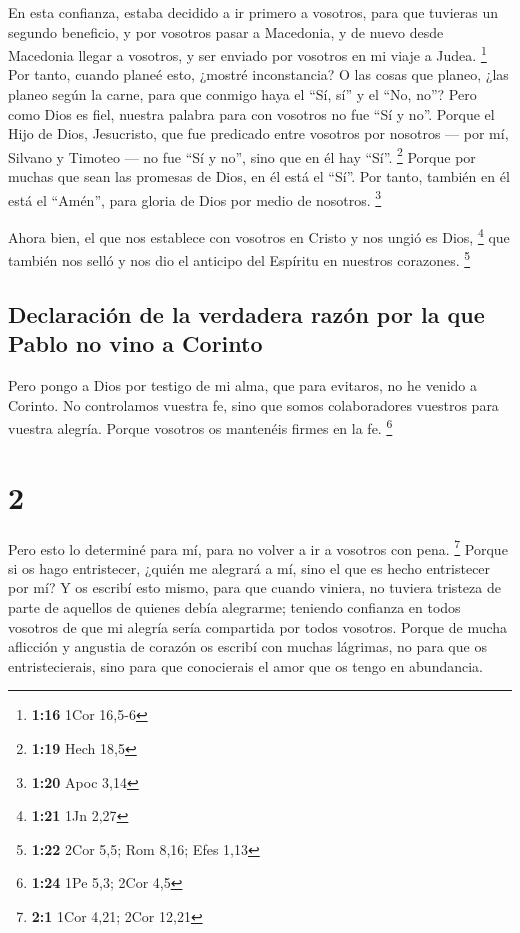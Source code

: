  En esta confianza, estaba decidido a ir primero a
vosotros, para que tuvieras un segundo beneficio,  y por
vosotros pasar a Macedonia, y de nuevo desde Macedonia llegar a
vosotros, y ser enviado por vosotros en mi viaje a Judea. \footnote{\textbf{1:16}
  1Cor 16,5-6}  Por tanto, cuando planeé esto, ¿mostré
inconstancia? O las cosas que planeo, ¿las planeo según la carne, para
que conmigo haya el ``Sí, sí'' y el ``No, no''?  Pero
como Dios es fiel, nuestra palabra para con vosotros no fue ``Sí y no''.
 Porque el Hijo de Dios, Jesucristo, que fue predicado
entre vosotros por nosotros --- por mí, Silvano y Timoteo --- no fue
``Sí y no'', sino que en él hay ``Sí''. \footnote{\textbf{1:19} Hech
  18,5}  Porque por muchas que sean las promesas de Dios,
en él está el ``Sí''. Por tanto, también en él está el ``Amén'', para
gloria de Dios por medio de nosotros. \footnote{\textbf{1:20} Apoc 3,14}

 Ahora bien, el que nos establece con vosotros en Cristo
y nos ungió es Dios, \footnote{\textbf{1:21} 1Jn 2,27} 
que también nos selló y nos dio el anticipo del Espíritu en nuestros
corazones. \footnote{\textbf{1:22} 2Cor 5,5; Rom 8,16; Efes 1,13}

\hypertarget{declaraciuxf3n-de-la-verdadera-razuxf3n-por-la-que-pablo-no-vino-a-corinto}{%
\subsection{Declaración de la verdadera razón por la que Pablo no vino a
Corinto}\label{declaraciuxf3n-de-la-verdadera-razuxf3n-por-la-que-pablo-no-vino-a-corinto}}

 Pero pongo a Dios por testigo de mi alma, que para
evitaros, no he venido a Corinto.  No controlamos vuestra
fe, sino que somos colaboradores vuestros para vuestra alegría. Porque
vosotros os mantenéis firmes en la fe. \footnote{\textbf{1:24} 1Pe 5,3;
  2Cor 4,5}

\hypertarget{section-1}{%
\section{2}\label{section-1}}

 Pero esto lo determiné para mí, para no volver a ir a
vosotros con pena. \footnote{\textbf{2:1} 1Cor 4,21; 2Cor 12,21}
 Porque si os hago entristecer, ¿quién me alegrará a mí,
sino el que es hecho entristecer por mí?  Y os escribí
esto mismo, para que cuando viniera, no tuviera tristeza de parte de
aquellos de quienes debía alegrarme; teniendo confianza en todos
vosotros de que mi alegría sería compartida por todos vosotros.
 Porque de mucha aflicción y angustia de corazón os
escribí con muchas lágrimas, no para que os entristecierais, sino para
que conocierais el amor que os tengo en abundancia.

